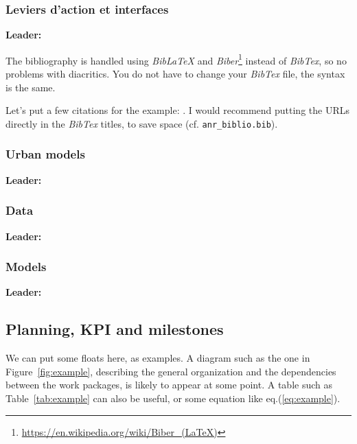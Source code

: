 \subsubsection{Leviers d'action et interfaces }
\textbf{Leader: }

The bibliography is handled using \textit{BibLaTeX} and \textit{Biber}\footnote{\url{https://en.wikipedia.org/wiki/Biber_(LaTeX)}} instead of \textit{BibTex}, so no problems with diacritics. You do not have to change your \textit{BibTex} file, the syntax is the same.

Let's put a few citations for the example: \cite{kilaniEnvironmentalImpactsBicycling2023,kilaniModelEvaluationUrban2023}. I would recommend putting the URLs directly in the \textit{BibTex} titles, to save space (cf. \texttt{anr\_biblio.bib}).



\subsubsection{Urban models}
\textbf{Leader: }



\subsubsection{Data}
\textbf{Leader: }


\subsubsection{Models}
\textbf{Leader: }


\subsection{Planning, KPI and milestones}





We can put some floats here, as examples. A diagram such as the one in Figure~\ref{fig:example}, describing the general organization and the dependencies between the work packages, is likely to appear at some point. A table such as Table~\ref{tab:example} can also be useful, or some equation like eq.(\ref{eq:example}).

